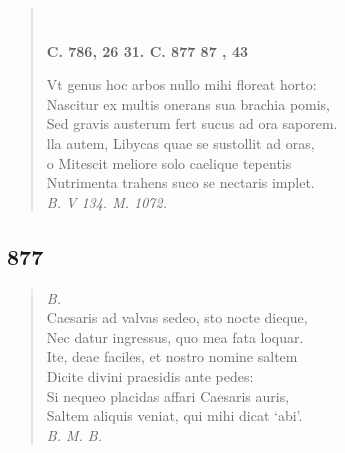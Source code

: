 \documentclass[11pt, a4paper]{report}
\begin{document}
\begin{verse}
        ﻿\pagebreak 
    \begin{center} \textbf{C. 786, 26 31. C. 877 87 , 43} \end{center} \marginpar{[327]} Vt genus hoc arbos nullo mihi floreat horto: \\ Nascitur ex multis onerans sua brachia pomis, \\ Sed gravis austerum fert sucus ad ora saporem. \\ lla autem, Libycas quae se sustollit ad oras, \\ o Mitescit meliore solo caelique tepentis \\ Nutrimenta trahens suco se nectaris implet. \\ \textit{B. V 134. M. 1072.} \\ 
      \end{verse}
  
            \subsection*{877}
      \begin{verse}
      \textit{B.} \\ Caesaris ad valvas sedeo, sto nocte dieque, \\ Nec datur ingressus, quo mea fata loquar. \\ Ite, deae faciles, et nostro nomine saltem \\ Dicite divini praesidis ante pedes: \\ Si nequeo placidas affari Caesaris auris, \\ Saltem aliquis veniat, qui mihi dicat ‘abi’. \\ \textit{B. M. B.} \\ 
      \end{verse}
  
\end{document}
